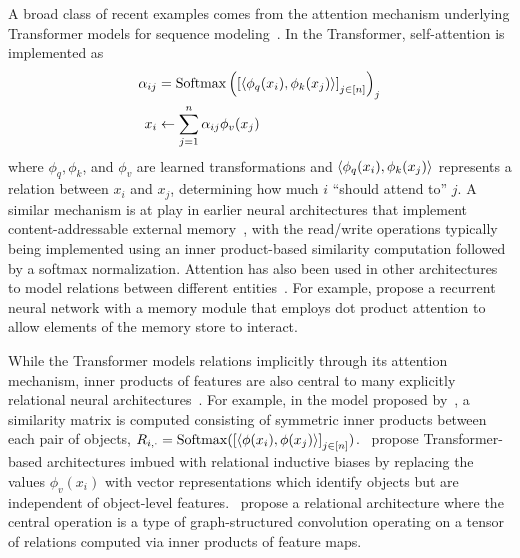 A broad class of recent examples comes from the attention mechanism underlying Transformer models for sequence modeling~\parencite{vaswani2017attention}. In the Transformer, self-attention is implemented as
\begin{equation*}
    \begin{split}
        \alpha_{ij} &= \mathrm{Softmax}\left(\left[{\left \langle \phi_q(x_i), \phi_k(x_j) \right\rangle}\right]_{j \in [n]}\right)_j\\
        x_i &\gets \sum_{j=1}^{n} \alpha_{ij} \phi_v(x_j)
    \end{split}
\end{equation*}
where $\phi_q, \phi_k$, and $\phi_v$ are learned transformations and $\left \langle \phi_q(x_i), \phi_k(x_j) \right\rangle$ represents a relation between $x_i$ and $x_j$, determining how much $i$ ``should attend to'' $j$. A similar mechanism is at play in earlier neural architectures that implement content-addressable external memory~\parencite{gravesNeuralTuringMachines2014,gravesHybridComputingUsing2016a,pritzelNeuralEpisodicControl2017}, with the read/write operations typically being implemented using an inner product-based similarity computation followed by a softmax normalization. Attention has also been used in other architectures to model relations between different entities~\parencite{velickovicGraphAttentionNetworks2017a,santoroRelationalRecurrentNeural2018,zambaldiDeepReinforcementLearning2018a,locatelloObjectCentricLearningSlot2020b}. For example, \citet{santoroRelationalRecurrentNeural2018} propose a recurrent neural network with a memory module that employs dot product attention to allow elements of the memory store to interact.

While the Transformer models relations implicitly through its attention mechanism, inner products of features are also central to many explicitly relational neural architectures~\parencite[e.g.,][]{webbEmergentSymbols2021,kergNeuralArchitecture2022,altabaaRelationalConvolutionalNetworks2023,altabaaAbstractorsRelationalCrossattention2024,altabaa2024disentangling}. For example, in the model proposed by~\cite{kergNeuralArchitecture2022}, a similarity matrix is computed consisting of symmetric inner products between each pair of objects, $R_{i,\cdot} = \mathrm{Softmax}(\left[\left \langle \phi(x_i), \phi(x_j) \right\rangle\right]_{j\in[n]})$.~\citet{altabaaAbstractorsRelationalCrossattention2024,altabaa2024disentangling} propose Transformer-based architectures imbued with relational inductive biases by replacing the values $\phi_v(x_i)$ with vector representations which identify objects but are independent of object-level features.~\citet{altabaaRelationalConvolutionalNetworks2023} propose a relational architecture where the central operation is a type of graph-structured convolution operating on a tensor of relations computed via inner products of feature maps.


